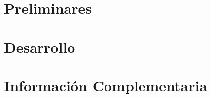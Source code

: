 \documentclass[a4paper,oneside,12pt]{book}
\begin{document}
\pagestyle{empty}\thispagestyle{empty}
\maketitle 
\frontmatter
%
%
\tableofcontents
\listoffigures
\listoftables
%
\mainmatter

\pagestyle{fancy}
	\fancyhf{}
	\renewcommand{\footrulewidth}{0.4pt}
	\fancyfoot[RO]{\thepage}

\part{Preliminares}



\part{Desarrollo}





\part{Información Complementaria}


\appendix








\nocite{*}


\end{document}
